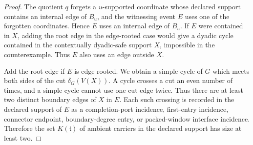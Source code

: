 \documentclass[11pt]{article}
\begin{document}
\begin{proof}
The quotient \(q\) forgets a \(u\)-supported coordinate whose declared support
contains an internal edge of \(B_u\), and the witnessing event \(E\) uses one
of the forgotten coordinates.  Hence \(E\) uses an internal edge of \(B_u\).
If \(E\) were contained in \(X\), adding the root edge in the edge-rooted case
would give a dyadic cycle contained in the contextually dyadic-safe support
\(X\), impossible in the counterexample.  Thus \(E\) also uses an edge outside
\(X\).

Add the root edge if \(E\) is edge-rooted.  We obtain a simple cycle of \(G\)
which meets both sides of the cut \(\delta_G(V(X))\).  A cycle crosses a cut an
even number of times, and a simple cycle cannot use one cut edge twice.  Thus
there are at least two distinct boundary edges of \(X\) in \(E\).  Each such
crossing is recorded in the declared support of \(E\) as a completion-port
incidence, first-entry incidence, connector endpoint, boundary-degree entry, or
packed-window interface incidence.  Therefore the set \(K(\mathfrak t)\) of
ambient carriers in the declared support has size at least two.
\end{proof}
\end{document}
